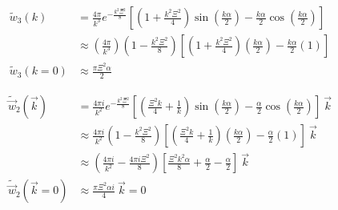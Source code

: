 \documentclass[double,12pt]{revtex4-2}
\begin{document}
\begin{align}
  \widetilde{w}_3(k) &= \frac{4\pi}{k^3}e^{-\frac{k^2\Xi^2}{8}}
    \left[\left(1+\frac{k^2\Xi^2}{4}\right)\sin\left(\frac{k\alpha}{2}
    \right)-\frac{k\alpha}{2}\cos\left(\frac{k\alpha}{2}\right)\right]\\
    & \approx \left(\frac{4\pi}{k^3}\right)\left(1-\frac{k^2\Xi^2}{8}
    \right)\left[\left(1+\frac{k^2\Xi^2}{4}\right)\left(\frac{k\alpha}
    {2}\right)-\frac{k\alpha}{2}\left(1\right)\right] \\
     \widetilde{w}_3(k=0) & \approx \frac{\pi\Xi^2\alpha}{2}
\end{align}

\begin{align}
   \widetilde{\vec{w}}_2(\vec{k})&= \frac{4\pi{i}}{k^2}
   e^{-\frac{k^2\Xi^2}{8}}
   \left[\left(\frac{\Xi^2k}{4}+\frac{1}{k}\right)\sin\left(
   \frac{k\alpha}{2}\right)
   -\frac{\alpha}{2}\cos\left(\frac{k\alpha}{2}\right)\right]
   {~}\vec{k} \\
    & \approx  \frac{4\pi{i}}{k^2}\left(1-\frac{k^2\Xi^2}{8}\right)
    \left[\left(\frac{\Xi^2k}{4}+\frac{1}{k}\right)\left(\frac{k\alpha}
    {2}\right)-\frac{\alpha}{2}\left(1\right)\right]{~}\vec{k}\\
    & \approx  \left(\frac{4\pi{i}}{k^2}-\frac{4\pi i\Xi^2}{8}\right)
    \left[\frac{\Xi^2k^2\alpha}{8}+\frac{\alpha}{2}-\frac{\alpha}{2}
    \right]{~}\vec{k} \\
    \widetilde{\vec w}_2(\vec k=0) & \approx \frac{\pi\Xi^2\alpha i}{4} 
    {~}\vec{k} = 0
\end{align}
\end{document}
